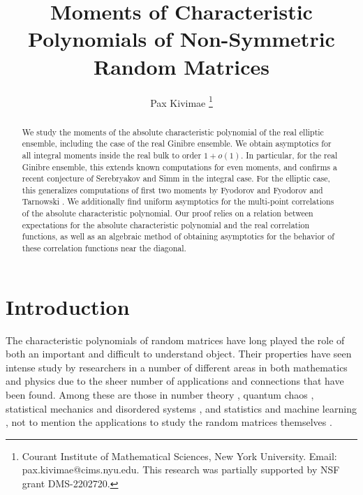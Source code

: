 \documentclass[12pt]{article}
\numberwithin{info}{section}
\numberwithin{equation}{section}
\renewcommand{\[}{\begin{equation}}
\renewcommand{\]}{\end{equation}}
\newcommand{\<}{\langle}
\renewcommand{\>}{\rangle}
\begin{document}
	\title{Moments of Characteristic Polynomials of Non-Symmetric Random Matrices}
	
	\author{
		Pax Kivimae \thanks{Courant Institute of Mathematical Sciences, New York University. Email: pax.kivimae@cims.nyu.edu. This research was partially supported by NSF grant DMS-2202720.}}
	
	\maketitle
	
	
	\begin{abstract}
		We study the moments of the absolute characteristic polynomial of the real elliptic ensemble, including the case of the real Ginibre ensemble. We obtain asymptotics for all integral moments inside the real bulk to order $1+o(1)$. In particular, for the real Ginibre ensemble, this extends known computations for even moments, and confirms a recent conjecture of Serebryakov and Simm \cite{nickrecent} in the integral case. For the elliptic case, this generalizes computations of first two moments by Fyodorov \cite{complexity-fyodorov-non-gradient} and Fyodorov and Tarnowski \cite{fyo-condition-elliptic}. We additionally find uniform asymptotics for the multi-point correlations of the absolute characteristic polynomial. Our proof relies on a relation between expectations for the absolute characteristic polynomial and the real correlation functions, as well as an algebraic method of obtaining asymptotics for the behavior of these correlation functions near the diagonal.
	\end{abstract}
	
	\maketitle
	
	\section{Introduction}
	
	The characteristic polynomials of random matrices have long played the role of both an important and difficult to understand object. Their properties have seen intense study by researchers in a number of different areas in both mathematics and physics due to the sheer number of applications and connections that have been found. Among these are those in number theory \cite{numbertheory-review}, quantum chaos \cite{qc1}, statistical mechanics and disordered systems \cite{tribe1,mp2,yan1}, and statistics and machine learning \cite{ml-complexity-1,replica-tensor-PCA,fyo-stat-2}, not to mention the applications to study the random matrices themselves \cite{fyo-condition-real,fyo-condition-elliptic, BrezinBegin,BrezinReal}.
	
\end{document}
